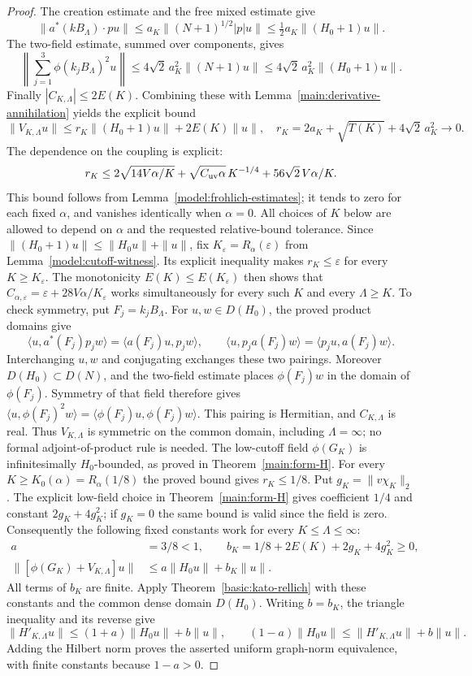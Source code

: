 \documentclass[11pt,a4paper]{article}
\theoremstyle{definition}
\theoremstyle{remark}
\begin{document}
\begin{proof}
The creation estimate and the free mixed estimate give
\[
 \|a^*(kB_\Lambda)\cdot pu\|
 \leq a_K\|(N+1)^{1/2}|p|u\|
 \leq\tfrac12 a_K\|(H_0+1)u\|.
\]
The two-field estimate, summed over components, gives
\[
 \left\|\sum_{j=1}^3\phi(k_jB_\Lambda)^2u\right\|
 \leq4\sqrt2\,a_K^2\|(N+1)u\|
 \leq4\sqrt2\,a_K^2\|(H_0+1)u\|.
\]
Finally $|C_{K,\Lambda}|\leq2E(K)$. Combining these with
Lemma~\ref{main:derivative-annihilation} yields the explicit bound
\[
 \|V_{K,\Lambda}u\|
 \leq r_K\|(H_0+1)u\|+2E(K)\|u\|,
 \quad r_K=2a_K+\sqrt{T(K)}+4\sqrt2\,a_K^2\longrightarrow0.
\]
The dependence on the coupling is explicit:
\[
 r_K\leq2\sqrt{14V\alpha/K}
       +\sqrt{C_{\rm uv}\alpha}\,K^{-1/4}
       +56\sqrt2\,V\alpha/K.
\]
This bound follows from Lemma~\ref{model:frohlich-estimates}; it
tends to zero for each fixed $\alpha$, and vanishes identically when
$\alpha=0$. All choices of $K$ below are allowed to depend on
$\alpha$ and the requested relative-bound tolerance.
Since $\|(H_0+1)u\|\leq\|H_0u\|+\|u\|$, fix
$K_\varepsilon=R_\alpha(\varepsilon)$ from
Lemma~\ref{model:cutoff-witness}. Its explicit inequality makes
$r_K\leq\varepsilon$ for every $K\geq K_\varepsilon$.
The monotonicity $E(K)\leq E(K_\varepsilon)$ then shows that
$C_{\alpha,\varepsilon}=\varepsilon+28V\alpha/K_\varepsilon$ works
simultaneously for every such $K$ and every $\Lambda\geq K$.
To check symmetry, put $F_j=k_jB_\Lambda$. For
$u,w\in D(H_0)$, the proved product domains give
\[
 \langle u,a^*(F_j)p_jw\rangle=\langle a(F_j)u,p_jw\rangle,
 \qquad
 \langle u,p_ja(F_j)w\rangle=\langle p_ju,a(F_j)w\rangle.
\]
Interchanging $u,w$ and conjugating exchanges these two pairings.
Moreover $D(H_0)\subset D(N)$, and the two-field estimate places
$\phi(F_j)w$ in the domain of $\phi(F_j)$. Symmetry of that field
therefore gives
$\langle u,\phi(F_j)^2w\rangle
 =\langle\phi(F_j)u,\phi(F_j)w\rangle$.
This pairing is Hermitian, and $C_{K,\Lambda}$ is real.
Thus $V_{K,\Lambda}$ is symmetric on the common domain, including
$\Lambda=\infty$; no formal adjoint-of-product rule is needed. The low-cutoff field
$\phi(G_K)$ is infinitesimally $H_0$-bounded, as proved in
Theorem~\ref{main:form-H}. For every
$K\geq K_0(\alpha)=R_\alpha(1/8)$ the proved bound gives
$r_K\leq1/8$. Put $g_K=\|v\chi_K\|_2$. The explicit
low-field choice in Theorem~\ref{main:form-H} gives coefficient
$1/4$ and constant $2g_K+4g_K^2$; if $g_K=0$ the same bound
is valid since the field is zero. Consequently the following fixed
constants work for every $K\leq\Lambda\leq\infty$:
\begin{align*}
 a&=3/8<1,\qquad b_K=1/8+2E(K)+2g_K+4g_K^2\geq0,\\
 \|[\phi(G_K)+V_{K,\Lambda}]u\|
       &\leq a\|H_0u\|+b_K\|u\|.
\end{align*}
All terms of $b_K$ are finite. Apply
Theorem~\ref{basic:kato-rellich} with these constants and the
common dense domain $D(H_0)$. Writing $b=b_K$, the triangle
inequality and its reverse give
\[
 \|H'_{K,\Lambda}u\|\leq(1+a)\|H_0u\|+b\|u\|,\qquad
 (1-a)\|H_0u\|\leq\|H'_{K,\Lambda}u\|+b\|u\|.
\]
Adding the Hilbert norm proves the asserted uniform graph-norm
equivalence, with finite constants because $1-a>0$.
\end{proof}
\end{document}
